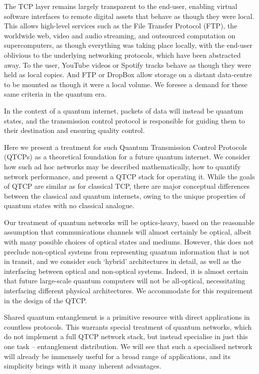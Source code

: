 The TCP layer remains largely transparent to the end-user, enabling virtual software interfaces to remote digital assets that behave as though they were local. This allows high-level services such as the File Transfer Protocol (FTP), the worldwide web, video and audio streaming, and outsourced computation on supercomputers, as though everything was taking place locally, with the end-user oblivious to the underlying networking protocols, which have been abstracted away. To the user, YouTube videos or Spotify tracks behave as though they were held as local copies. And FTP or DropBox allow storage on a distant data-centre to be mounted as though it were a local volume. We foresee a demand for these same criteria in the quantum era.

In the context of a quantum internet, packets of data will instead be quantum states, and the transmission control protocol is responsible for guiding them to their destination and ensuring quality control.

Here we present a treatment for such Quantum Transmission Control Protocols (QTCPs) as a theoretical foundation for a future quantum internet. We consider how such ad hoc networks may be described mathematically, how to quantify network performance, and present a QTCP stack for operating it. While the goals of QTCP are similar as for classical TCP, there are major conceptual differences between the classical and quantum internets, owing to the unique properties of quantum states with no classical analogue.

Our treatment of quantum networks will be optics-heavy, based on the reasonable assumption that communications channels will almost certainly be optical, albeit with many possible choices of optical states and mediums. However, this does not preclude non-optical systems from representing quantum information that is not in transit, and we consider such `hybrid' architectures in detail, as well as the interfacing between optical and non-optical systems. Indeed, it is almost certain that future large-scale quantum computers will not be all-optical, necessitating interfacing different physical architectures. We accommodate for this requirement in the design of the QTCP.

Shared quantum entanglement is a primitive resource with direct applications in countless protocols. This warrants special treatment of quantum networks, which do not implement a full QTCP network stack, but instead specialise in just this one task -- entanglement distribution. We will see that such a specialised network will already be immensely useful for a broad range of applications, and its simplicity brings with it many inherent advantages.

